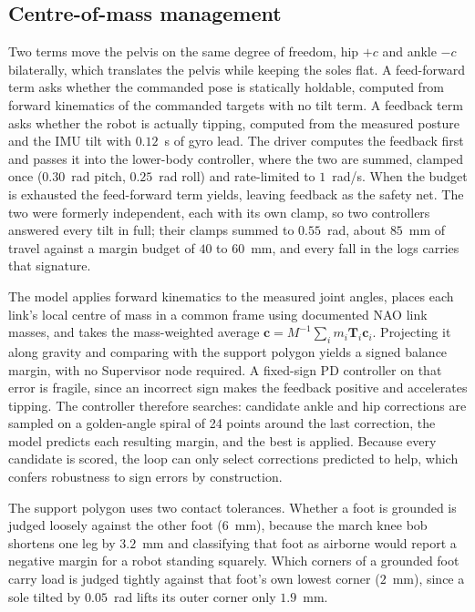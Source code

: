 \documentclass[twocolumn]{article}
\begin{document}
\subsection{Centre-of-mass management}

Two terms move the pelvis on the same degree of freedom, hip $+c$ and ankle $-c$ bilaterally,
which translates the pelvis while keeping the soles flat. A feed-forward term asks whether the
commanded pose is statically holdable, computed from forward kinematics of the commanded
targets with no tilt term. A feedback term asks whether the robot is actually tipping, computed
from the measured posture and the IMU tilt with $0.12$~s of gyro lead. The driver computes the
feedback first and passes it into the lower-body controller, where the two are summed, clamped
once ($0.30$~rad pitch, $0.25$~rad roll) and rate-limited to $1$~rad/s. When the budget is
exhausted the feed-forward term yields, leaving feedback as the safety net. The two were
formerly independent, each with its own clamp, so two controllers answered every tilt in full;
their clamps summed to $0.55$~rad, about $85$~mm of travel against a margin budget of $40$ to
$60$~mm, and every fall in the logs carries that signature.

The model applies forward kinematics to the measured joint angles, places each link's local
centre of mass in a common frame using documented NAO link masses, and takes the mass-weighted
average $\mathbf{c} = M^{-1}\sum_i m_i \mathbf{T}_i \mathbf{c}_i$. Projecting it along gravity
and comparing with the support polygon yields a signed balance margin, with no Supervisor node
required. A fixed-sign PD controller on that error is fragile, since an incorrect sign makes
the feedback positive and accelerates tipping. The controller therefore searches: candidate
ankle and hip corrections are sampled on a golden-angle spiral of 24 points around the last
correction, the model predicts each resulting margin, and the best is applied. Because every
candidate is scored, the loop can only select corrections predicted to help, which confers
robustness to sign errors by construction.

The support polygon uses two contact tolerances. Whether a foot is grounded is judged loosely
against the other foot ($6$~mm), because the march knee bob shortens one leg by $3.2$~mm and
classifying that foot as airborne would report a negative margin for a robot standing squarely.
Which corners of a grounded foot carry load is judged tightly against that foot's own lowest
corner ($2$~mm), since a sole tilted by $0.05$~rad lifts its outer corner only $1.9$~mm.
\end{document}
